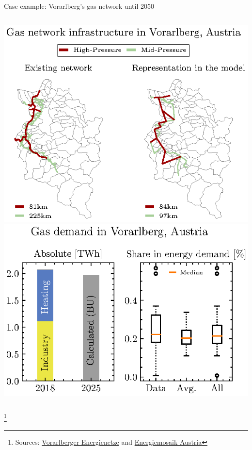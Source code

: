 \documentclass[aspectratio=169]{beamer}
\newcommand\blfootnote[1]{%
	\begingroup
	\renewcommand\thefootnote{}\footnote{#1}%
	\addtocounter{footnote}{-1}%
	\endgroup
}
\begin{document}
\begin{frame}{Case example: Vorarlberg's gas network until 2050}
	\begin{columns}[T] 	
		\includegraphics[scale=0.85]{Network_T8.eps}
		\vspace{0.75cm}
		\includegraphics[scale=0.75]{Comparison_of_the_demand.eps}
	\end{columns} 
\blfootnote{\tiny Sources: \href{https://www.vorarlbergnetz.at/erdgasnetz.htm}{Vorarlberger Energienetze} and \href{https://www.energiemosaik.at/intro}{Energiemosaik Austria}}
\end{frame}
\end{document}
